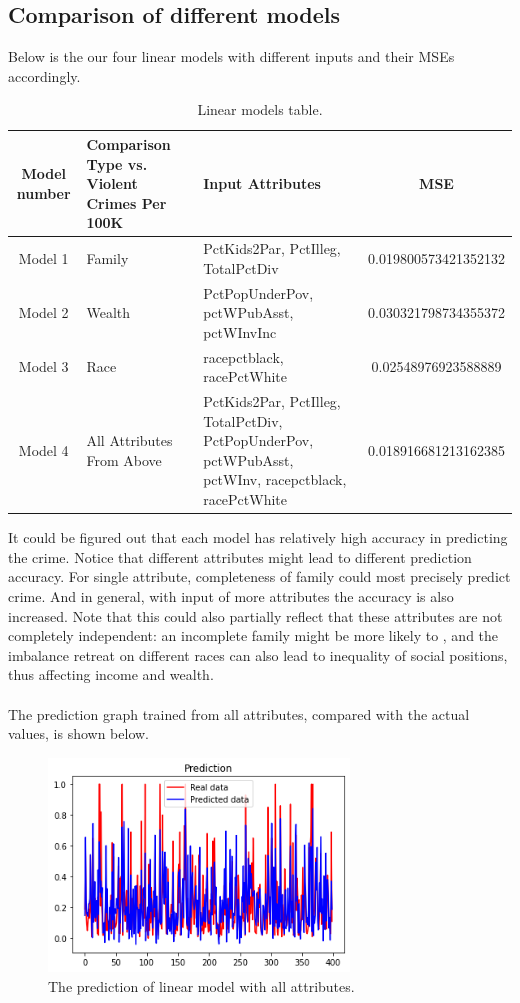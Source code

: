 \documentclass[letterpaper, 11 pt, conference]{article}
\begin{document}
\subsection{Comparison of different models}
Below is the our four linear models with different inputs and their MSEs accordingly.
\begin{table}[H]
\centering
\begin{tabular}{ |c|p{2cm}|p{8cm}|c| } 
Model number & {Comparison Type vs. Violent Crimes Per 100K} &Input Attributes & MSE \\\hline
Model 1 & Family   & {PctKids2Par, PctIlleg, TotalPctDiv} & 0.019800573421352132
\\
Model 2 & Wealth  & PctPopUnderPov, pctWPubAsst, pctWInvInc & 0.030321798734355372
\\Model 3 & Race  & racepctblack, racePctWhite & 0.02548976923588889
\\Model 4 & All Attributes From Above  & PctKids2Par,  PctIlleg,  TotalPctDiv,  PctPopUnderPov,  pctWPubAsst,  pctWInv, racepctblack, racePctWhite & 0.018916681213162385
\\
\end{tabular}
\caption{\label{tab:widgets}Linear models table.}
\end{table}
It could be figured out that each model has relatively high accuracy in predicting the crime. Notice that different attributes might lead to different prediction accuracy. For single attribute, completeness of family could most precisely predict crime. And in general, with input of more attributes the accuracy is also increased. Note that this could also partially reflect that these attributes are not completely independent: an incomplete family might be more likely to , and the imbalance retreat on different races can also lead to inequality of social positions, thus affecting income and wealth. 
\\
\\The prediction graph trained from all attributes, compared with the actual values, is shown below.
\begin{figure}[H]
\centering
\includegraphics[width=8cm]{pred_all.png}
\caption{The prediction of linear model with all attributes.}
\label{fig:hotbo}
\end{figure}
\end{document}
